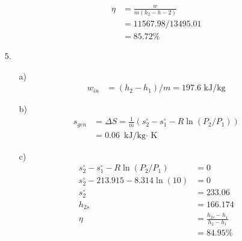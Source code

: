 \documentclass{article}
\begin{document}
\begin{itemize}
\begin{itemize}
\begin{align*}
            \eta &=\frac{w}{m(h_2-h-2)}\\
            &=11567.98/13495.01\\
            &=85.72\%
        \end{align*}
    \end{itemize}
    \item [5.]
    \begin{itemize}
        \item [a)]
        \begin{align*}
            w_{in}&=(h_2-h_1)/m = 197.6 \text{ kJ/kg}
        \end{align*}
        \item [b)]
        \begin{align*}
            s_{gen}&=\Delta S = \frac{1}{m}(s^\circ_2-s^\circ_1-R\ln(P_2/P_1))\\
            &=0.06 \text{ kJ/kg\(\cdot\) K}
        \end{align*}
        \item [c)]
        \begin{align*}
            s^\circ_2-s^\circ_1-R\ln(P_2/P_1)&=0\\
            s^\circ_2-213.915-8.314\ln (10)&=0\\
            s^\circ_2&=233.06\\
            h_{2s}&=166.174\\
            \eta &= \frac{h_{2s}-h_1}{h_2-h_1}\\
            &=84.95 \%
        \end{align*}
    \end{itemize}
\end{itemize}     
\end{document}

